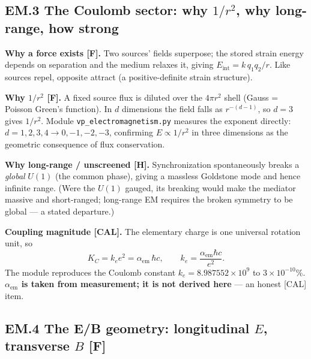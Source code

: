 \documentclass[
  10pt,
]{article}
\begin{document}
\hypertarget{em.3-the-coulomb-sector-why-1r2-why-long-range-how-strong}{%
\subsection{\texorpdfstring{EM.3 The Coulomb sector: why \(1/r^2\), why
long-range, how
strong}{EM.3 The Coulomb sector: why 1/r\^{}2, why long-range, how strong}}\label{em.3-the-coulomb-sector-why-1r2-why-long-range-how-strong}}

\textbf{Why a force exists {[}F{]}.} Two sources' fields superpose; the
stored strain energy depends on separation and the medium relaxes it,
giving \(E_{\text{int}} = k\,q_1 q_2 / r\). Like sources repel, opposite
attract (a positive-definite strain structure).

\textbf{Why \(1/r^2\) {[}F{]}.} A fixed source flux is diluted over the
\(4\pi r^2\) shell (Gauss = Poisson Green's function). In \(d\)
dimensions the field falls as \(r^{-(d-1)}\), so \(d=3\) gives
\(1/r^2\). Module \texttt{vp\_electromagnetism.py} measures the exponent
directly: \(d=1,2,3,4 \to 0,-1,-2,-3\), confirming \(E\propto 1/r^2\) in
three dimensions as the geometric consequence of flux conservation.

\textbf{Why long-range / unscreened {[}H{]}.} Synchronization
spontaneously breaks a \emph{global} \(U(1)\) (the common phase), giving
a massless Goldstone mode and hence infinite range. (Were the \(U(1)\)
gauged, its breaking would make the mediator massive and short-ranged;
long-range EM requires the broken symmetry to be global --- a stated
departure.)

\textbf{Coupling magnitude {[}CAL{]}.} The elementary charge is one
universal rotation unit, so
\[ K_C = k_e e^2 = \alpha_{\mathrm{em}}\,\hbar c, \qquad
   k_e = \frac{\alpha_{\mathrm{em}}\hbar c}{e^2}. \] The module
reproduces the Coulomb constant \(k_e = 8.987552\times 10^9\) to
\(3\times 10^{-10}\)\%. \textbf{\(\alpha_{\mathrm{em}}\) is taken from
measurement; it is not derived here} --- an honest {[}CAL{]} item.

\hypertarget{em.4-the-eb-geometry-longitudinal-e-transverse-b-f}{%
\subsection{\texorpdfstring{EM.4 The E/B geometry: longitudinal \(E\),
transverse \(B\)
\textbf{{[}F{]}}}{EM.4 The E/B geometry: longitudinal E, transverse B {[}F{]}}}\label{em.4-the-eb-geometry-longitudinal-e-transverse-b-f}}
\end{document}
